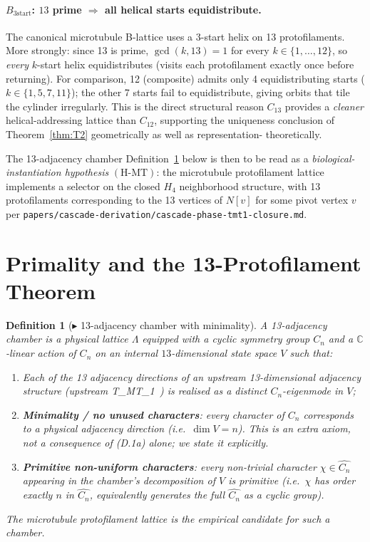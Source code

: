 \documentclass[12pt]{article}
\newtheorem{definition}[theorem]{Definition}
\begin{document}
\paragraph{$B_{\mathrm{3start}}$: $13$ prime $\Rightarrow$ all
helical starts equidistribute.} The canonical microtubule
B-lattice uses a 3-start helix on 13 protofilaments. More
strongly: since 13 is prime, $\gcd(k, 13) = 1$ for every
$k \in \{1, \ldots, 12\}$, so \emph{every} $k$-start helix
equidistributes (visits each protofilament exactly once before
returning). For comparison, 12 (composite) admits only 4
equidistributing starts ($k \in \{1, 5, 7, 11\}$); the other 7
starts fail to equidistribute, giving orbits that tile the
cylinder irregularly. This is the direct structural reason
$C_{13}$ provides a \emph{cleaner} helical-addressing lattice
than $C_{12}$, supporting the uniqueness conclusion of
Theorem~\ref{thm:T2} geometrically as well as representation-
theoretically.

The 13-adjacency chamber Definition~\ref{def:D1} below is then to
be read as a \emph{biological-instantiation hypothesis}
$(\mathrm{H\text{-}MT})$: the microtubule protofilament lattice
implements a selector on the closed $H_4$ neighborhood structure,
with 13 protofilaments corresponding to the 13 vertices of $N[v]$
for some pivot vertex $v$ per
\texttt{papers/cascade-derivation/cascade-phase-tmt1-closure.md}.

\section{Primality and the 13-Protofilament Theorem}\label{sec:C13}

\begin{definition}[$\blacktriangleright$ 13-adjacency chamber with minimality]\label{def:D1}
A \emph{13-adjacency chamber} is a physical lattice $\Lambda$
equipped with a cyclic symmetry group $C_n$ and a
$\mathbb{C}$-linear action of $C_n$ on an internal $13$-dimensional
state space $V$ such that:
\begin{enumerate}
\item[(D.1a)] Each of the 13 adjacency directions of an
  upstream 13-dimensional adjacency structure (upstream
  T\_MT\_1~\cite{CascadePhotonMicrotubuleAlpha}) is realised as a
  distinct $C_n$-eigenmode in $V$;
\item[(D.1b)] \textbf{Minimality / no unused characters}: every
  character of $C_n$ corresponds to a physical adjacency
  direction (i.e.\ $\dim V = n$). This is an extra axiom, not a
  consequence of (D.1a) alone; we state it explicitly.
\item[(D.1c)] \textbf{Primitive non-uniform characters}: every
  non-trivial character $\chi \in \widehat{C_n}$ appearing in
  the chamber's decomposition of $V$ is \emph{primitive} (i.e.\
  $\chi$ has order exactly $n$ in $\widehat{C_n}$, equivalently
  generates the full $\widehat{C_n}$ as a cyclic group).
\end{enumerate}
The microtubule protofilament lattice is the empirical candidate
for such a chamber.
\end{definition}
\end{document}
